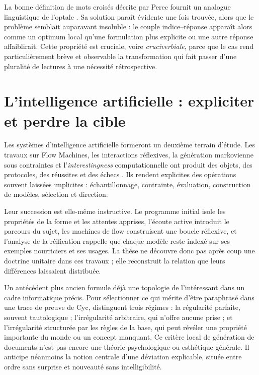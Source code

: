 \documentclass[11pt,a4paper]{article}
\begin{document}
La bonne définition de mots croisés décrite par Perec fournit un analogue
linguistique de l'optale \parencite{perec1999motscroises}. Sa solution paraît
évidente une fois trouvée, alors que le problème semblait auparavant insoluble : le
couple indice--réponse apparaît alors comme un optimum local qu'une formulation
plus explicite ou une autre réponse affaiblirait. Cette propriété est cruciale,
voire \emph{cruciverbiale}, parce que le cas rend particulièrement brève et
observable la transformation qui fait passer d'une pluralité de lectures à une
nécessité rétrospective.

\section{L'intelligence artificielle : expliciter et perdre la cible}

Les systèmes d'intelligence artificielle formeront un deuxième terrain d'étude.
Les travaux sur Flow Machines, les interactions réflexives, la génération
markovienne sous contraintes et l'\emph{interestingness} computationnelle ont
produit des objets, des protocoles, des réussites et des échecs
\parencite{pachet1999surprising,pachet1999active,pachet1999programs,pachet2000melodie,
pachet2002continuatorinteraction,pachet2004flowmachines,pachet2004reification,
pachet2004cybernetic,pachet2004childrenreflect,addessi2005experiments,
pachet2006clefs,pachet2006creativity,pachet2006reflective,pachet2008machines,
jones2009stimulating,pachet2006interactionsreflexives,addessi2006flowmachine,
aucouturier2002similarity,pachetroy2008hitsong,pachet2011hitsong,
lerch2011closedloop,
milipachet1995regularity,pachet2012virtuosity,martin2016creativeprocess,
pachet2021assisted,pachet2026markov}.
Ils rendent explicites des opérations souvent laissées implicites :
échantillonnage, contrainte, évaluation, construction de modèles, sélection et
direction.

Leur succession est elle-même instructive. Le programme initial isole les
propriétés de la forme et les attentes apprises, l'écoute active introduit le
parcours du sujet, les machines de flow construisent une boucle réflexive, et
l'analyse de la réification rappelle que chaque modèle reste indexé sur ses
exemples nourriciers et ses usages. La thèse ne découvre donc pas après coup une
doctrine unitaire dans ces travaux ; elle reconstruit la relation que leurs
différences laissaient distribuée.

Un antécédent plus ancien formule déjà une topologie de l'intéressant dans un
cadre informatique précis. Pour sélectionner ce qui mérite d'être paraphrasé
dans une trace de preuve de Cyc, \textcite{milipachet1995regularity} distinguent
trois régimes : la régularité parfaite, souvent tautologique ; l'irrégularité
arbitraire, qui n'offre aucune prise ; et l'irrégularité structurée par les
règles de la base, qui peut révéler une propriété importante du monde ou un
concept manquant. Ce critère local de génération de documents n'est pas encore
une théorie psychologique ou esthétique générale. Il anticipe néanmoins la
notion centrale d'une déviation explicable, située entre ordre sans surprise et
nouveauté sans intelligibilité.
\end{document}
